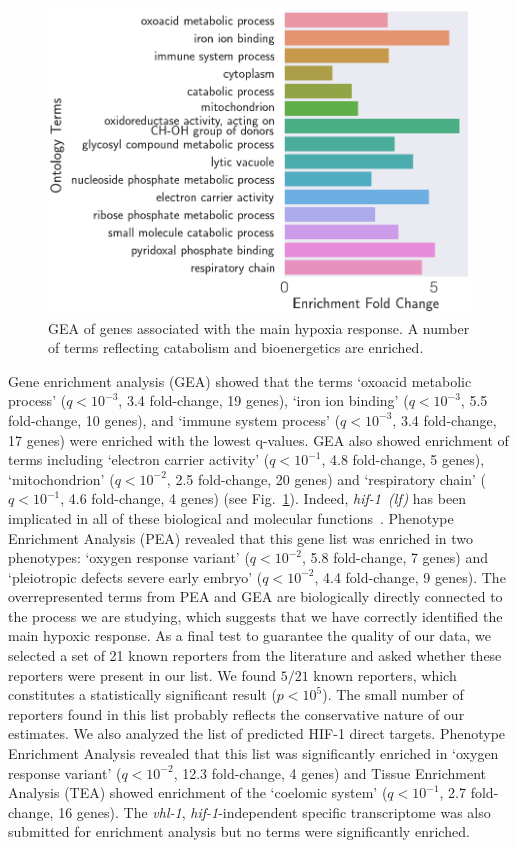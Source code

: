 \documentclass[9pt,twocolumn,twoside]{pnas-new}
\newcommand{\qval}[1]{$q<10^{-#1}$}
\newcommand{\gene}[1]{\emph{#1}}
\newcommand{\hif}{\emph{hif-1~(lf)}}
\newcommand{\hifp}{HIF-1}
\begin{document}
\begin{figure}[tbhp]
\centering
\includegraphics[width=\linewidth]{figs/hypoxia_response_gea.pdf}
\caption{
GEA of genes associated with the main hypoxia response. A number of terms
reflecting catabolism and bioenergetics are enriched.
}
\label{fig:hyp_gea}
\end{figure}

Gene enrichment analysis (GEA) showed that the terms `oxoacid metabolic process'
(\qval{3}, 3.4 fold-change, 19 genes),
`iron ion binding' (\qval{3}, 5.5 fold-change, 10 genes),
and `immune system process' (\qval{3}, 3.4 fold-change, 17 genes) were enriched
with the lowest q-values. GEA also showed enrichment of terms including
`electron carrier activity' (\qval{1}, 4.8 fold-change, 5 genes),
`mitochondrion' (\qval{2}, 2.5 fold-change, 20 genes)
and `respiratory chain' (\qval{1}, 4.6 fold-change, 4 genes) (see
Fig.~\ref{fig:hyp_gea}). Indeed, \hif{} has been implicated in
all of these biological and molecular functions~\cite{Luhachack2012,Ackerman2012,
Romney2011,Semenza2011}. Phenotype Enrichment Analysis (PEA) revealed that this
gene list was enriched in two phenotypes: `oxygen response variant' (\qval{2},
5.8 fold-change, 7 genes) and `pleiotropic defects severe early embryo' (\qval{2},
4.4 fold-change, 9 genes). The overrepresented terms from PEA and GEA are biologically
directly connected to the process we are studying, which suggests that we have
correctly identified the main hypoxic response. As a final test to guarantee the
quality of our data, we selected a set of 21 known reporters from the literature
and asked whether these reporters were present in our list. We found $5/21$ known
reporters, which constitutes a statistically significant result ($p<10^{5}$).
The small number of reporters found in this list probably reflects the conservative
nature of our estimates. We also analyzed the list of predicted \hifp{} direct targets.
Phenotype Enrichment Analysis revealed that this list was significantly enriched in
`oxygen response variant' (\qval{2}, 12.3 fold-change, 4 genes) and Tissue Enrichment
Analysis (TEA) showed enrichment of the `coelomic system' (\qval{1}, 2.7 fold-change,
16 genes). The \gene{vhl-1}, \gene{hif-1}-independent specific transcriptome was also submitted
for enrichment analysis but no terms were significantly enriched.
\end{document}

